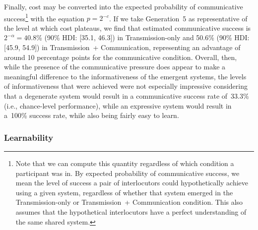 \documentclass[doc,biblatex]{apa7}
\begin{document}
Finally, cost may be converted into the expected probability of communicative success\footnote{Note that we can compute this quantity regardless of which condition a participant was in. By expected probability of communicative success, we mean the level of success a pair of interlocutors could hypothetically achieve using a given system, regardless of whether that system emerged in the Transmission-only or Transmission~+ Communication condition. This also assumes that the hypothetical interlocutors have a perfect understanding of the same shared system.} with the equation $p=2^{-c}$. If we take Generation~5 as representative of the level at which cost plateaus, we find that estimated communicative success is $2^{-\alpha} = 40.8$\% (90\% HDI: [35.1, 46.3]) in Transmission-only and 50.6\% (90\% HDI: [45.9, 54.9]) in Transmission~+ Communication, representing an advantage of around 10 percentage points for the communicative condition. Overall, then, while the presence of the communicative pressure does appear to make a meaningful difference to the informativeness of the emergent systems, the levels of informativeness that were achieved were not especially impressive considering that a degenerate system would result in a communicative success rate of~33.3\% (i.e., chance-level performance), while an expressive system would result in a~100\% success rate, while also being fairly easy to learn.

\subsubsection{Learnability}
\end{document}
